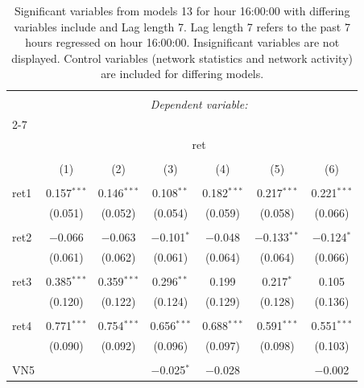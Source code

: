 
\begin{table}[!htbp] \centering 
  \caption{Significant variables from models 13 for hour 16:00:00 with differing variables include 
                               and Lag length 7. Lag length 7 refers to the past 7 hours regressed on hour 16:00:00. 
                               Insignificant variables are not displayed. 
                               Control variables (network statistics and network activity) are 
                               included for differing models.} 
  \label{RVmodels1_t_hourlagged3} 
\scriptsize 
\begin{tabular}{@{\extracolsep{5pt}}lcccccc} 
\\[-1.8ex]\hline 
\hline \\[-1.8ex] 
 & \multicolumn{6}{c}{\textit{Dependent variable:}} \\ 
\cline{2-7} 
\\[-1.8ex] & \multicolumn{6}{c}{ret} \\ 
\\[-1.8ex] & (1) & (2) & (3) & (4) & (5) & (6)\\ 
\hline \\[-1.8ex] 
 ret1 & 0.157$^{***}$ & 0.146$^{***}$ & 0.108$^{**}$ & 0.182$^{***}$ & 0.217$^{***}$ & 0.221$^{***}$ \\ 
  & (0.051) & (0.052) & (0.054) & (0.059) & (0.058) & (0.066) \\ 
  & & & & & & \\ 
 ret2 & $-$0.066 & $-$0.063 & $-$0.101$^{*}$ & $-$0.048 & $-$0.133$^{**}$ & $-$0.124$^{*}$ \\ 
  & (0.061) & (0.062) & (0.061) & (0.064) & (0.064) & (0.066) \\ 
  & & & & & & \\ 
 ret3 & 0.385$^{***}$ & 0.359$^{***}$ & 0.296$^{**}$ & 0.199 & 0.217$^{*}$ & 0.105 \\ 
  & (0.120) & (0.122) & (0.124) & (0.129) & (0.128) & (0.136) \\ 
  & & & & & & \\ 
 ret4 & 0.771$^{***}$ & 0.754$^{***}$ & 0.656$^{***}$ & 0.688$^{***}$ & 0.591$^{***}$ & 0.551$^{***}$ \\ 
  & (0.090) & (0.092) & (0.096) & (0.097) & (0.098) & (0.103) \\ 
  & & & & & & \\ 
 VN5 &  &  & $-$0.025$^{*}$ & $-$0.028 &  & $-$0.002 \\ 

\end{tabular}
\end{table}
